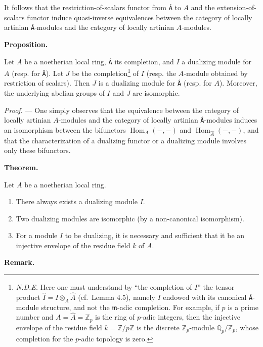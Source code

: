 \documentclass[
]{article}
\begin{document}
It follows that the restriction-of-scalars functor from \texttt{Â} to
\(A\) and the extension-of-scalars functor induce quasi-inverse
equivalences between the category of locally artinian \texttt{Â}-modules
and the category of locally artinian \(A\)-modules.

\textbf{Proposition.}

Let \(A\) be a noetherian local ring, \texttt{Â} its completion, and
\(I\) a dualizing module for \(A\) (resp. for \texttt{Â}). Let \(J\) be
the completion\footnote{\emph{N.D.E.} Here one must understand by ``the
  completion of \(I\)'' the tensor product
  \(\hat{I} = I \otimes_{A} \hat{A}\) (cf.~Lemma 4.5), namely \(I\)
  endowed with its canonical \texttt{Â}-module structure, and not the
  \(\mathfrak{m}\)-adic completion. For example, if \(p\) is a prime
  number and \(A = \hat{A} = \mathbb{Z}_{p}\) is the ring of \(p\)-adic
  integers, then the injective envelope of the residue field
  \(k = \mathbb{Z}/p\mathbb{Z}\) is the discrete
  \(\mathbb{Z}_{p}\)-module \(\mathbb{Q}_{p}/\mathbb{Z}_{p}\), whose
  completion for the \(p\)-adic topology is zero.} of \(I\) (resp. the
\(A\)-module obtained by restriction of scalars). Then \(J\) is a
dualizing module for \texttt{Â} (resp. for \(A\)). Moreover, the
underlying abelian groups of \(I\) and \(J\) are isomorphic.

\emph{Proof.} --- One simply observes that the equivalence between the
category of locally artinian \(A\)-modules and the category of locally
artinian \texttt{Â}-modules induces an isomorphism between the
bifunctors \(\operatorname{Hom}_{A}(-, -)\) and
\(\operatorname{Hom}_{\hat{A}}(-, -)\), and that the characterization of
a dualizing functor or a dualizing module involves only these
bifunctors.

\textbf{Theorem.}

Let \(A\) be a noetherian local ring.

\begin{enumerate}
\def\labelenumi{\alph{enumi})}
\item
  There always exists a dualizing module \(I\).
\item
  Two dualizing modules are isomorphic (by a non-canonical isomorphism).
\item
  For a module \(I\) to be dualizing, it is necessary and sufficient
  that it be an injective envelope of the residue field \(k\) of \(A\).
\end{enumerate}

\textbf{Remark.}
\end{document}
